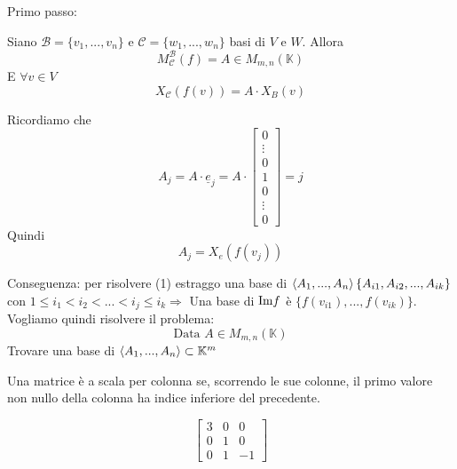 Primo passo:
\begin{dimostrazione}
    Siano $\mathscr{B} = \{v_1,...,v_n\}$ e $\mathscr{C}= \{w_1,...,w_n\}$ basi di $V$ e $W$. Allora
    \begin{equation}
        M^{\mathscr{B}}_{\mathscr{C}}(f) = A\in M_{m,n}(\mathbb{K})
    \end{equation}
    E $\forall v\in V$
    \begin{equation}
        X_{\mathscr{C}}(f(v))=A\cdot X_B(v)
    \end{equation}

    Ricordiamo che
    \begin{equation}
        A_j=A\cdot \underline{e}_j = A\cdot \left[\begin{smallmatrix}
            0 \\ \vdots \\ 0 \\ 1 \\ 0 \\ \vdots \\ 0
        \end{smallmatrix}\right] = j
    \end{equation}
    Quindi
    \begin{equation}
        A_j= X_e(f(v_j))
    \end{equation}

    Conseguenza: per risolvere (1) estraggo una base di $\left\langle{A_1,...,A_n}\right\rangle \{A_{i1}, A_{i2},...,A_{ik}\}$ con $1\leq i_1 < i_2 < ... < i_j \leq i_k \Rightarrow$ Una base di $\text{Im}f$ è $\{f(v_{i1}),...,f(v_{ik})\}$. \newline
    Vogliamo quindi risolvere il problema:
    \begin{equation}
        \text{Data } A\in M_{m,n}(\mathbb{K})
    \end{equation}
    Trovare una base di $\left\langle{A_1,...,A_n}\right\rangle\subset \mathbb{K}^m$
\end{dimostrazione}

\begin{definizione}
    Una matrice è a scala per colonna se, scorrendo le sue colonne, il primo valore non nullo della colonna ha indice inferiore del precedente.
\end{definizione}
\begin{esempio}
    \begin{equation}
        \begin{bmatrix}
            3 & 0 & 0 \\
            0 & 1 & 0 \\
            0 & 1 & -1
        \end{bmatrix}
    \end{equation}
\end{esempio}

